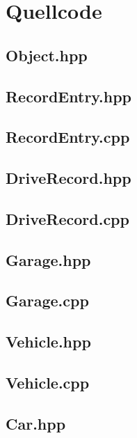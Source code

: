 \documentclass[12pt,naustrian,a4widepaper]{scrartcl}
\begin{document}
\section{Quellcode}

\subsection{Object.hpp}


\subsection{RecordEntry.hpp}


\subsection{RecordEntry.cpp}


\subsection{DriveRecord.hpp}


\subsection{DriveRecord.cpp}


\subsection{Garage.hpp}


\subsection{Garage.cpp}


\subsection{Vehicle.hpp}


\subsection{Vehicle.cpp}


\subsection{Car.hpp}

\end{document}
